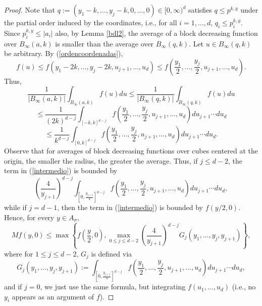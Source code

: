 \documentclass[12pt]{amsart}
\numberwithin{equation}{section}
\theoremstyle{plain}
\theoremstyle{definition}
\theoremstyle{remark}
\begin{document}
\begin{proof}
Note that
$q:=(y_1-k,\ldots,y_j-k, 0,\ldots,0)\in [0,\infty)^d$
satisfies $q\le p^{k,y}$ under the partial order induced
by the coordinates, i.e., for all $i=1,\dots, d$, $q_i\le p_i^{k,y}$.
Since $ p_i^{k,y} \le |a_i|$ also,
by Lemma \ref{bdl2}, the average of a block decreasing function over
$B_\infty (a, k)$ is smaller than the average over
$B_\infty (q, k)$. Let $u\in B_\infty (q, k)$ be arbitrary.
By (\ref{ordencoordenadas}),
\begin{equation*}
 f(u)\le
f(y_1-2k,\ldots,y_j-2k,u_{j+1},\ldots,u_{d})\le
f\left(\frac{y_1}{2},\ldots,\frac{y_j}{2},u_{j+1},\ldots,u_{d}\right).
\end{equation*}
 Thus,
\begin{equation*}
 \frac{1}{|B_\infty (a, k)|}\int_{B_\infty (a, k)} f(u)du\le \frac{1}{|B_\infty(q,k)|}\int_{B_\infty(q,k)}
 f(u)du
\end{equation*}
\begin{equation*}
 \le \frac{1}{(2k)^{d-j}}\int_{[-k,k]^{d-j}}f\left(\frac{y_1}{2},\ldots,\frac{y_j}{2},u_{j+1},\ldots,u_{d}\right)du_{j+1}\cdots
  du_d
\end{equation*}
\begin{equation}\label{intermedio}
  \le \frac{1}{k^{d-j}}\int_{[0,k]^{d-j}}f\left(\frac{y_1}{2},\ldots,\frac{y_j}{2},u_{j+1},\ldots,u_{d}\right)du_{j+1}\cdots
  du_d.
\end{equation}
Observe that for averages of block decreasing functions over cubes
centered at the origin, the smaller the radius, the greater
the average. Thus, if $j\le d-2$, the term in
(\ref{intermedio}) is bounded by
\begin{equation*}
\left(\frac{4}{y_{j+1}}\right)^{d-j}\int_{\left[0,\frac{y_{j+1}}{4}\right]^{d-j}}f\left(\frac{y_1}{2},\ldots,\frac{y_j}{2},u_{j+1},\ldots,u_{d}\right)du_{j+1}\cdots
  du_d,
\end{equation*}
while if $j=d-1$, then the term in
(\ref{intermedio}) is bounded by $f(y/2,0)$.
 Hence, for every $y\in A_\sigma$,
\begin{equation*}
  Mf(y,0)\le \max\left\{f\left(\frac{y}{2},0\right),\max_{0\le j\le
  d-2}\left(\frac{4}{y_{j+1}}\right)^{d-j}G_j(y_1,\ldots,y_j,y_{j+1})\right\},
\end{equation*}
where for $1\le j \le d - 2$, $G_j$ is defined via
\begin{equation*}
  G_j (y_1,\ldots,y_j,y_{j+1}):=\int_{\left[0,\frac{y_{j+1}}{4}\right]^{d-j}}f\left(\frac{y_1}{2},\ldots,\frac{y_j}{2},u_{j+1},\ldots,u_{d}\right)
  du_{j+1}\cdots
  du_d,
\end{equation*}
and if $j = 0$, we just use the same formula, but integrating
$f(u_1,\dots, u_d)$ (i.e., no $y_i$ appears as an argument of $f$).


\end{proof}
\end{document}
